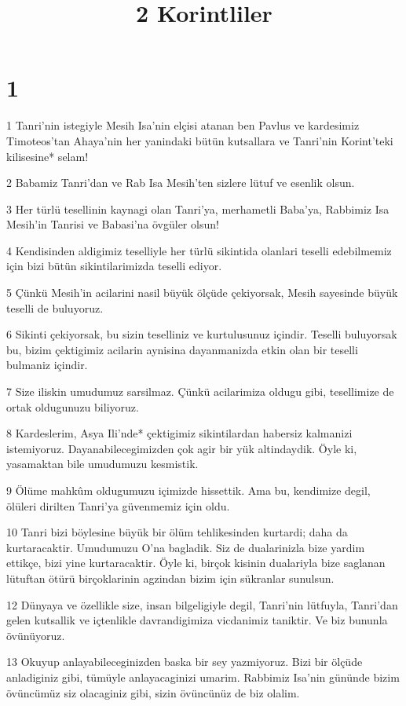 

\title{2 Korintliler}


\chapter{1}

\par 1 Tanri'nin istegiyle Mesih Isa'nin elçisi atanan ben Pavlus ve kardesimiz Timoteos'tan Ahaya'nin her yanindaki bütün kutsallara ve Tanri'nin Korint'teki kilisesine* selam!
\par 2 Babamiz Tanri'dan ve Rab Isa Mesih'ten sizlere lütuf ve esenlik olsun.
\par 3 Her türlü tesellinin kaynagi olan Tanri'ya, merhametli Baba'ya, Rabbimiz Isa Mesih'in Tanrisi ve Babasi'na övgüler olsun!
\par 4 Kendisinden aldigimiz teselliyle her türlü sikintida olanlari teselli edebilmemiz için bizi bütün sikintilarimizda teselli ediyor.
\par 5 Çünkü Mesih'in acilarini nasil büyük ölçüde çekiyorsak, Mesih sayesinde büyük teselli de buluyoruz.
\par 6 Sikinti çekiyorsak, bu sizin teselliniz ve kurtulusunuz içindir. Teselli buluyorsak bu, bizim çektigimiz acilarin aynisina dayanmanizda etkin olan bir teselli bulmaniz içindir.
\par 7 Size iliskin umudumuz sarsilmaz. Çünkü acilarimiza oldugu gibi, tesellimize de ortak oldugunuzu biliyoruz.
\par 8 Kardeslerim, Asya Ili'nde* çektigimiz sikintilardan habersiz kalmanizi istemiyoruz. Dayanabilecegimizden çok agir bir yük altindaydik. Öyle ki, yasamaktan bile umudumuzu kesmistik.
\par 9 Ölüme mahkûm oldugumuzu içimizde hissettik. Ama bu, kendimize degil, ölüleri dirilten Tanri'ya güvenmemiz için oldu.
\par 10 Tanri bizi böylesine büyük bir ölüm tehlikesinden kurtardi; daha da kurtaracaktir. Umudumuzu O'na bagladik. Siz de dualarinizla bize yardim ettikçe, bizi yine kurtaracaktir. Öyle ki, birçok kisinin dualariyla bize saglanan lütuftan ötürü birçoklarinin agzindan bizim için sükranlar sunulsun.
\par 12 Dünyaya ve özellikle size, insan bilgeligiyle degil, Tanri'nin lütfuyla, Tanri'dan gelen kutsallik ve içtenlikle davrandigimiza vicdanimiz taniktir. Ve biz bununla övünüyoruz.
\par 13 Okuyup anlayabileceginizden baska bir sey yazmiyoruz. Bizi bir ölçüde anladiginiz gibi, tümüyle anlayacaginizi umarim. Rabbimiz Isa'nin gününde bizim övüncümüz siz olacaginiz gibi, sizin övüncünüz de biz olalim.
